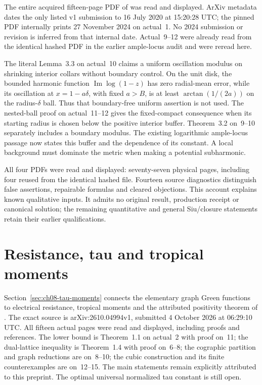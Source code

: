 The entire acquired fifteen-page PDF of
\cite{Zeriahi20ModulusV1} was read and displayed.
ArXiv metadata dates the only listed v1 submission
to 16 July 2020 at 15:20:28 UTC; the pinned PDF
internally prints 27 November 2024 on actual~1.
No 2024 submission or revision is inferred from
that internal date. Actual~9--12 were already
read from the identical hashed PDF in the earlier
ample-locus audit and were reread here.

The literal Lemma~3.3 on actual~10 claims a
uniform oscillation modulus on shrinking interior
collars without boundary control. On the unit disk,
the bounded harmonic function $\operatorname{Im}
\log(1-z)$ has zero radial-mean error, while its
oscillation at $x=1-a\delta$, with fixed $a>B$,
is at least $\arctan(1/(2a))$ on the
radius-$\delta$ ball. Thus that boundary-free
uniform assertion is not used. The nested-ball
proof on actual~11--12 gives the fixed-compact
consequence when its starting radius is chosen
below the positive interior buffer. Theorem~3.2
on~9--10 separately includes a boundary modulus.
The existing logarithmic ample-locus passage now
states this buffer and the dependence of its
constant. A local background must dominate the
metric when making a potential subharmonic.

All four PDFs were read and displayed:
seventy-seven physical pages, including four
reused from the identical hashed file.
Fourteen source diagnostics distinguish false
assertions, repairable formulas and cleared objections.
This account explains known qualitative inputs.
It admits no original result, production receipt
or canonical solution; the remaining quantitative
and general Siu/closure statements retain their
earlier qualifications.

\section{Resistance, tau and tropical moments}
\label{sec:provenance-tau-moments}

Section~\ref{sec:ch08-tau-moments} connects the elementary graph
Green functions to electrical resistance, tropical moments and the
attributed positivity theorem of
\cite{Wang26TauV1}. The exact source is
arXiv:\allowbreak 2610.04994v1, submitted 4 October 2026 at
06:29:10 UTC. All fifteen actual pages were read and displayed,
including proofs and references. The lower bound is Theorem~1.1
on actual~2 with proof on~11; the dual-lattice inequality is
Theorem~1.4 with proof on~6--8; the cographic partition and graph
reductions are on~8--10; the cubic construction and its finite
counterexamples are on~12--15. The main statements remain
explicitly attributed to this preprint. The optimal universal
normalized tau constant is still open.

